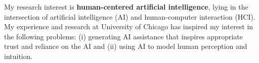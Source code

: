 




My research interest is \textbf{human-centered artificial intelligence}, lying in the intersection of artificial intelligence (AI) and human-computer interaction (HCI). 
My experience and research at University of Chicago has inspired my interest in the following problems: 
(i) generating AI assistance that inspires appropriate trust and reliance on the AI
and
(ii) using AI to model human perception and intuition.
\\